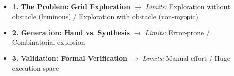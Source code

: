 \begin{frame}{}

\begin{itemize}
  \item<1-> \textbf{1. The Problem: Grid Exploration}
        \newline {\footnotesize\textcolor{softgray}{[Bramas et al. 2021, Sardar et al. 2024, ...]}}
        \newline $\rightarrow$ \textit{Limits:} Exploration without obstacle (luminous) / Exploration with obstacle (non-myopic)
  \vspace{0.4cm}

  \item<1-> \textbf{2. Generation: Hand vs. Synthesis}
        \newline {\footnotesize\textcolor{softgray}{[Bonnet et al. 2014, Millet et al. 2014, ...]}}
        \newline $\rightarrow$ \textit{Limits:} Error-prone / Combinatorial explosion
  \vspace{0.4cm}

  \item<1-> \textbf{3. Validation: Formal Verification}
        \newline {\footnotesize\textcolor{softgray}{[Bérard et al. 2016, Courtieu et al. 2022, ...]}}
        \newline $\rightarrow$ \textit{Limits:} Manual effort / Huge execution space
\end{itemize}

\end{frame}
